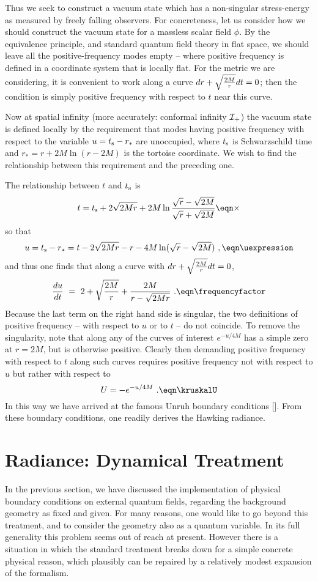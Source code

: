 Thus we seek to construct a vacuum state which has a
non-singular stress-energy as measured by freely falling
observers.  For concreteness, let us consider how we should
construct the vacuum state for
a massless scalar field $\phi$.
By the equivalence principle, and standard quantum field
theory in flat space, we should leave all the positive-frequency
modes empty -- where positive frequency is defined in a coordinate
system that is locally flat.  For the metric we are considering,
it is convenient to work along a curve
$dr+ \sqrt {2M\over r} dt =0$; then the condition is simply positive
frequency with respect to $t$ near this curve.

Now at spatial infinity (more accurately: conformal infinity
${\cal I}_+$) the vacuum state is defined
locally by the requirement that
modes having positive frequency with respect to the variable
$u = t_{\rm s} -r_*$ are unoccupied, where $t_{\rm s}$
is Schwarzschild
time and $r_* = r + 2M\ln (r -2M)$ is the tortoise coordinate.
We wish to find the relationship between this
requirement and the preceding one.

The relationship between $t$ and $t_{\rm s}$ is
$$
t = t_{\rm s} + 2 \sqrt{2Mr} +
  2M \ln {{\sqrt r - \sqrt{2M} } \over {\sqrt r + \sqrt{2M} }}
\eqn\times
$$
so that
$$
u = t_{\rm s} - r_* =
t - 2 \sqrt{2Mr} -r -4M \ln (\sqrt r - \sqrt{2M} )~,
\eqn\uexpression
$$
and thus one finds that along a curve with $dr+ \sqrt {2M\over r} dt =0$,
$$
{du\over dt}~=~ 2 + \sqrt {2M\over r} + {2M \over r - \sqrt{2Mr} }~.
\eqn\frequencyfactor
$$
Because the last term on the right hand side
is singular, the two definitions of positive
frequency -- with respect to $u$ or to $t$ -- do not coincide.
To remove the singularity, note that along any of
the curves of interest
$e^{-u/4M}$ has a simple zero at $r=2M$, but is otherwise positive.
Clearly then demanding positive frequency with respect to
$t$ along such curves requires positive frequency not with respect
to $u$ but rather with respect to
$$
U = - e^{-u/4M}~.
\eqn\kruskalU
$$
In this way we have arrived at the famous Unruh
boundary conditions [\unruh ]. From these boundary conditions, one readily
derives the Hawking radiance.



\chapter{Radiance: Dynamical Treatment}


In the previous section, we have discussed the implementation of
physical boundary conditions on external quantum fields, regarding
the background geometry as fixed and given.  For many reasons, one
would like to go beyond this treatment, and to consider the geometry
also as a quantum variable.   In its full generality this problem
seems out of reach at present.   However there is a
situation in which the standard treatment breaks down for
a simple concrete physical reason, which
plausibly can be repaired by a relatively
modest expansion of the formalism.


